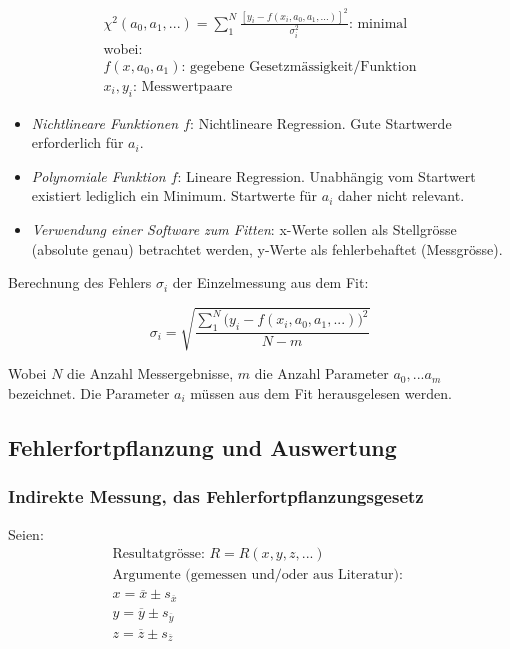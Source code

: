 \begin{gather*}
    \chi^2(a_0,a_1,...) = \sum_{1}^{N}{\frac{[y_i - f(x_i,a_0,a_1,...)]^2}{\sigma_i^2}} \text{: minimal}\\
    \text{wobei:} \\
    f(x,a_0,a_1) \text{: gegebene Gesetzm\"assigkeit/Funktion} \\
    x_i,y_i \text{: Messwertpaare}
\end{gather*}

\begin{itemize}
    \item
        \emph{Nichtlineare   Funktionen  $f$}: Nichtlineare   Regression. Gute
        Startwerde erforderlich f\"ur $a_i$.
    \item
        \emph{Polynomiale Funktion  $f$}: Lineare Regression. Unabh\"angig vom
        Startwert  existiert  lediglich  ein Minimum. Startwerte  f\"ur  $a_i$
        daher nicht relevant.
    \item
        \emph{Verwendung  einer  Software  zum  Fitten}:  x-Werte  sollen  als
        Stellgr\"osse   (absolute  genau)   betrachtet  werden,   y-Werte  als
        fehlerbehaftet (Messgr\"osse).
\end{itemize}

Berechnung des Fehlers $\sigma_i$ der Einzelmessung aus dem Fit:

\begin{equation*}
    \sigma_i = \sqrt{\frac{\sum_1^N{(y_i-f(x_i,a_0,a_1,...)})^2}{N - m}}
\end{equation*}

Wobei $N$  die Anzahl  Messergebnisse, $m$  die Anzahl  Parameter $a_0,...a_m$
bezeichnet. Die Parameter $a_i$ m\"ussen aus dem Fit herausgelesen werden.


\subsection{Fehlerfortpflanzung und Auswertung}

\subsubsection{Indirekte Messung, das Fehlerfortpflanzungsgesetz}

Seien:
\begin{gather*}
    \text{Resultatgr\"osse: } R = R(x,y,z,...) \\
    \text{Argumente (gemessen und/oder aus Literatur): } \\
    x = \overline{x} \pm s_{\overline{x}} \\
    y = \overline{y} \pm s_{\overline{y}} \\
    z = \overline{z} \pm s_{\overline{z}}
\end{gather*}

